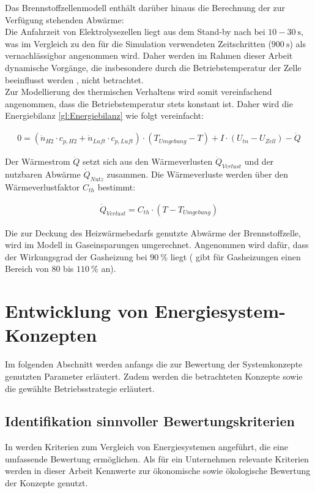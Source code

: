 Das Brennstoffzellenmodell enthält darüber hinaus die Berechnung der zur Verfügung stehenden Abwärme:\\
Die Anfahrzeit von Elektrolysezellen liegt aus dem Stand-by nach \citet{milanzi_technischer_2018} bei $10-\SI{30}{\s}$, was im Vergleich zu den für die Simulation verwendeten Zeitschritten ($\SI{900}{\s}$) als vernachlässigbar angenommen wird. Daher werden im Rahmen dieser Arbeit dynamische Vorgänge, die insbesondere durch die  Betriebstemperatur der Zelle beeinflusst werden \citep{garcia-valverde_simple_2012}, nicht betrachtet.\\
Zur Modellierung des thermischen Verhaltens wird somit vereinfachend angenommen, dass die Betriebstemperatur stets konstant ist. Daher wird die Energiebilanz \ref{gl:Energiebilanz} wie folgt vereinfacht:

\begin{align}
0 = (\dot{n}_{H2} \cdot c_{p, H2} + \dot{n}_{Luft} \cdot c_{p, Luft}) \cdot (T_{Umgebung} - T) + I \cdot (U_{tn} - U_{Zell}) - \dot{Q}
\end{align}

Der Wärmestrom $\dot{Q}$ setzt sich aus den Wärmeverlusten $\dot{Q}_{Verlust}$ und der nutzbaren Abwärme $\dot{Q}_{Nutz}$ zusammen. Die Wärmeverluste werden über den Wärmeverlustfaktor $C_{th}$ bestimmt:

\begin{align}
\dot{Q}_{Verlust} = C_{th} \cdot (T - T_{Umgebung}) 
\end{align}

Die zur Deckung des Heizwärmebedarfs genutzte Abwärme der Brennstoffzelle, wird im Modell in Gaseinsparungen umgerechnet. Angenommen wird dafür, dass der Wirkungsgrad der Gasheizung bei $\SI{90}{\%}$ liegt (\citet{herrmann_effizienz_2006} gibt für Gasheizungen einen Bereich von $80$ bis $\SI{110}{\%}$ an).\\ 

\section{Entwicklung von Energiesystem-Konzepten}
Im folgenden Abschnitt werden anfangs die zur Bewertung der Systemkonzepte genutzten Parameter erläutert. Zudem werden die betrachteten Konzepte sowie die gewählte Betriebsstrategie erläutert.

\subsection{Identifikation sinnvoller Bewertungskriterien}
In \citet{reich_grundlagen_2018} werden Kriterien zum Vergleich von Energiesystemen angeführt, die eine umfassende Bewertung ermöglichen. Als für ein Unternehmen relevante Kriterien werden in dieser Arbeit Kennwerte zur ökonomische sowie ökologische Bewertung der Konzepte genutzt.\\

